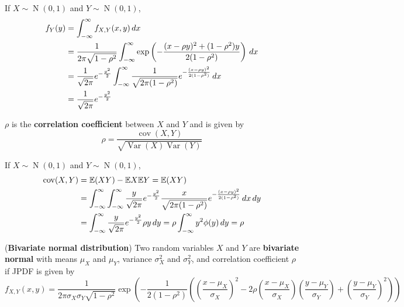 \documentclass{huhtakm-template-book}
\newcommand{\expect}{\mathbb{E}}
\DeclareMathOperator{\N}{N}
\DeclareMathOperator{\Var}{Var}
\DeclareMathOperator{\cov}{cov}
\begin{document}
    \begin{rem}
        If $X\sim\N(0,1)$ and $Y\sim\N(0,1)$,
        \begin{align*}
            f_{Y}(y)&=\int_{-\infty}^{\infty} f_{X,Y}(x,y)\,dx\\
            &=\frac{1}{2\pi\sqrt{1-\rho^{2}}}\int_{-\infty}^{\infty}\exp\left(-\frac{(x-\rho y)^{2}+(1-\rho^{2})y}{2(1-\rho^{2})}\right)\,dx\\
            &=\frac{1}{\sqrt{2\pi}}e^{-\frac{y^{2}}{2}}\int_{-\infty}^{\infty}\frac{1}{\sqrt{2\pi(1-\rho^{2})}}e^{-\frac{(x-\rho y)^{2}}{2(1-\rho^{2})}}\,dx\\
            &=\frac{1}{\sqrt{2\pi}}e^{-\frac{y^{2}}{2}}
        \end{align*}
    \end{rem}
    \begin{rem}
        $\rho$ is the \textbf{correlation coefficient} between $X$ and $Y$ and is given by
        \begin{equation*}
            \rho=\frac{\cov(X,Y)}{\sqrt{\Var(X)\Var(Y)}}
        \end{equation*}
    \end{rem}
    \begin{rem}
        If $X\sim\N(0,1)$ and $Y\sim\N(0,1)$,
        \begin{align*}
            \cov(X,Y)&=\expect(XY)-\expect X\expect Y=\expect(XY)\\
            &=\intinfty\intinfty\frac{y}{\sqrt{2\pi}}e^{-\frac{y^{2}}{2}}\frac{x}{\sqrt{2\pi(1-\rho^{2})}}e^{-\frac{(x-\rho y)^{2}}{2(1-\rho^{2})}}\,dx\,dy\\
            &=\intinfty\frac{y}{\sqrt{2\pi}}e^{-\frac{y^{2}}{2}}\rho y\,dy=\rho\intinfty y^{2}\phi(y)\,dy=\rho
        \end{align*}
    \end{rem}
    \begin{eg}(\textbf{Bivariate normal distribution})
        Two random variables $X$ and $Y$ are \textbf{bivariate normal} with means $\mu_{X}$ and $\mu_{Y}$, variance $\sigma_{X}^{2}$ and $\sigma_{Y}^{2}$, and correlation coefficient $\rho$ if JPDF is given by
        \begin{equation*}
            f_{X,Y}(x,y)=\frac{1}{2\pi\sigma_{X}\sigma_{Y}\sqrt{1-\rho^{2}}}\exp\left(-\frac{1}{2(1-\rho^{2})}\left(\left(\frac{x-\mu_{X}}{\sigma_{X}}\right)^{2}-2\rho\left(\frac{x-\mu_{X}}{\sigma_{X}}\right)\left(\frac{y-\mu_{Y}}{\sigma_{Y}}\right)+\left(\frac{y-\mu_{Y}}{\sigma_{Y}}\right)^{2}\right)\right)
        \end{equation*}
    \end{eg}
\end{document}
